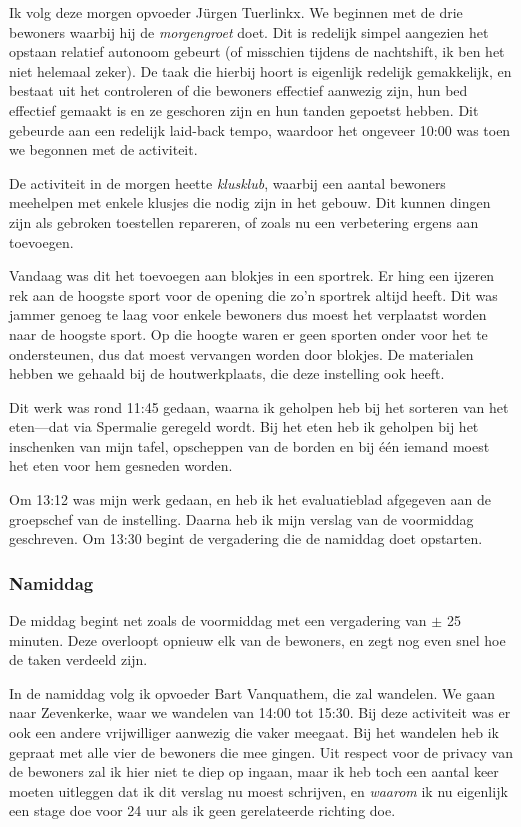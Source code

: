 \documentclass[a4paper,12pt]{article}
\begin{document}
Ik volg deze morgen opvoeder Jürgen Tuerlinkx. We beginnen met de drie bewoners waarbij hij de \emph{morgengroet} doet. Dit is redelijk simpel aangezien het opstaan relatief autonoom gebeurt (of misschien tijdens de nachtshift, ik ben het niet helemaal zeker). De taak die hierbij hoort is eigenlijk redelijk gemakkelijk, en bestaat uit het controleren of die bewoners effectief aanwezig zijn, hun bed effectief gemaakt is en ze geschoren zijn en hun tanden gepoetst hebben. Dit gebeurde aan een redelijk laid-back tempo, waardoor het ongeveer 10:00 was toen we begonnen met de activiteit.

De activiteit in de morgen heette \emph{klusklub}, waarbij een aantal bewoners meehelpen met enkele klusjes die nodig zijn in het gebouw. Dit kunnen dingen zijn als gebroken toestellen repareren, of zoals nu een verbetering ergens aan toevoegen.

Vandaag was dit het toevoegen aan blokjes in een sportrek. Er hing een ijzeren rek aan de hoogste sport voor de opening die zo'n sportrek altijd heeft. Dit was jammer genoeg te laag voor enkele bewoners dus moest het verplaatst worden naar de hoogste sport. Op die hoogte waren er geen sporten onder voor het te ondersteunen, dus dat moest vervangen worden door blokjes. De materialen hebben we gehaald bij de houtwerkplaats, die deze instelling ook heeft.

Dit werk was rond 11:45 gedaan, waarna ik geholpen heb bij het sorteren van het eten---dat via Spermalie geregeld wordt. Bij het eten heb ik geholpen bij het inschenken van mijn tafel, opscheppen van de borden en bij één iemand moest het eten voor hem gesneden worden.

Om 13:12 was mijn werk gedaan, en heb ik het evaluatieblad afgegeven aan de groepschef van de instelling. Daarna heb ik mijn verslag van de voormiddag geschreven. Om 13:30 begint de vergadering die de namiddag doet opstarten.

\subsubsection{Namiddag}

De middag begint net zoals de voormiddag met een vergadering van $\pm$ 25 minuten. Deze overloopt opnieuw elk van de bewoners, en zegt nog even snel hoe de taken verdeeld zijn.

In de namiddag volg ik opvoeder Bart Vanquathem, die zal wandelen. We gaan naar Zevenkerke, waar we wandelen van 14:00 tot 15:30. Bij deze activiteit was er ook een andere vrijwilliger aanwezig die vaker meegaat. Bij het wandelen heb ik gepraat met alle vier de bewoners die mee gingen. Uit respect voor de privacy van de bewoners zal ik hier niet te diep op ingaan, maar ik heb toch een aantal keer moeten uitleggen dat ik dit verslag nu moest schrijven, en \emph{waarom} ik nu eigenlijk een stage doe voor 24 uur als ik geen gerelateerde richting doe.
\end{document}
